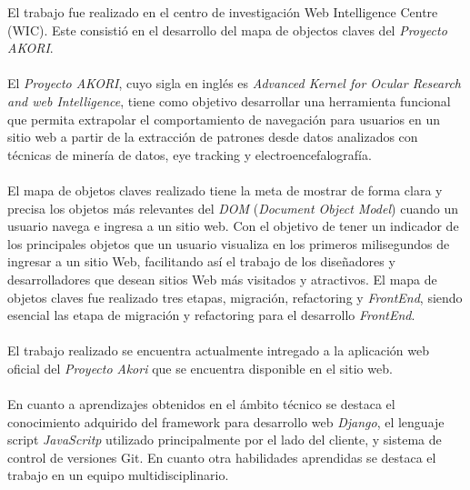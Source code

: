 \documentclass[letterpaper,11pt]{article} %
\begin{document}







\begin{resumen}
	El trabajo fue realizado en el centro de investigación Web Intelligence Centre (WIC). Este consistió en el desarrollo del mapa de objectos claves del \textit{Proyecto AKORI}. \\ \\
	El \textit{Proyecto AKORI}, cuyo sigla en inglés es \textit{Advanced Kernel for Ocular Research and web Intelligence}, tiene como objetivo desarrollar una herramienta funcional que permita extrapolar el comportamiento de navegación para usuarios en un sitio web a partir de la extracción
de patrones desde datos analizados con técnicas de minería de datos, eye tracking y electroencefalografía. \\ \\
	El mapa de objetos claves realizado tiene la meta de mostrar de forma clara y precisa los objetos más relevantes del \textit{DOM} (\textit{Document Object Model}) cuando un usuario navega e ingresa a un sitio web. Con el objetivo de tener un indicador de los principales objetos que un usuario visualiza en los primeros milisegundos de ingresar a un sitio Web, facilitando así el trabajo de los diseñadores y desarrolladores que desean sitios Web más visitados y atractivos. El mapa de objetos claves fue realizado tres etapas, migración, refactoring y \textit{FrontEnd}, siendo esencial las etapa de migración y refactoring para el desarrollo \textit{FrontEnd}. \\ \\
	El trabajo realizado se encuentra actualmente intregado a la aplicación web oficial del \textit{Proyecto Akori} que se encuentra disponible en el sitio web. \\ \\
	En cuanto a aprendizajes obtenidos en el ámbito técnico se destaca el conocimiento adquirido del framework para desarrollo web \textit{Django}, el lenguaje script \textit{JavaScritp} utilizado principalmente por el lado del cliente, y sistema de control de versiones Git. En cuanto otra habilidades aprendidas se destaca el trabajo en un equipo multidisciplinario.
\end{resumen}






\end{document}
